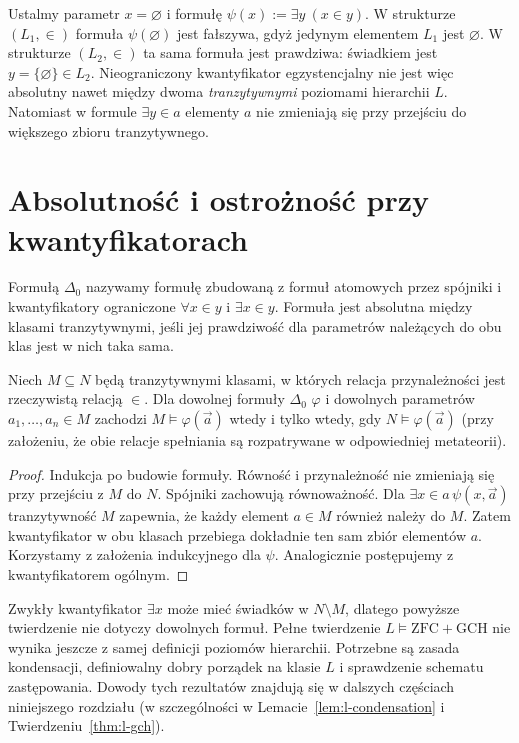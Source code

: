 \begin{przyklad}
\label{ex:l-unbounded-quantifier-34}
Ustalmy parametr $x=\varnothing$ i formułę
$\psi(x):=\exists y\ (x\in y)$. W strukturze
$(L_1,\in)$ formuła $\psi(\varnothing)$ jest fałszywa,
gdyż jedynym elementem $L_1$ jest $\varnothing$.
W strukturze $(L_2,\in)$ ta sama formuła jest
prawdziwa: świadkiem jest $y=\{\varnothing\}\in L_2$.
Nieograniczony kwantyfikator egzystencjalny nie jest
więc absolutny nawet między dwoma \emph{tranzytywnymi}
poziomami hierarchii $L$. Natomiast w formule
$\exists y\in a$ elementy $a$ nie zmieniają się
przy przejściu do większego zbioru tranzytywnego.
\end{przyklad}
\section{Absolutność i ostrożność przy kwantyfikatorach}
\begin{definicja}\label{def:delta0}
Formułą $\Delta_0$ nazywamy formułę zbudowaną z formuł atomowych przez spójniki i kwantyfikatory ograniczone $\forall x\in y$ i $\exists x\in y$. Formuła jest absolutna między klasami tranzytywnymi, jeśli jej prawdziwość dla parametrów należących do obu klas jest w nich taka sama.
\end{definicja}
\begin{twierdzenie}\label{thm:delta0-absolute}
Niech $M\subseteq N$ będą tranzytywnymi klasami, w których relacja przynależności jest rzeczywistą relacją $\in$. Dla dowolnej formuły $\Delta_0$ $\varphi$ i dowolnych parametrów $a_1,\ldots,a_n\in M$ zachodzi $M\models\varphi(\vec a)$ wtedy i tylko wtedy, gdy $N\models\varphi(\vec a)$ (przy założeniu, że obie relacje spełniania są rozpatrywane w odpowiedniej metateorii).
\end{twierdzenie}
\begin{proof}
Indukcja po budowie formuły. Równość i przynależność nie zmieniają się przy przejściu z $M$ do $N$. Spójniki zachowują równoważność. Dla $\exists x\in a\,\psi(x,\vec a)$ tranzytywność $M$ zapewnia, że każdy element $a\in M$ również należy do $M$. Zatem kwantyfikator w obu klasach przebiega dokładnie ten sam zbiór elementów $a$. Korzystamy z założenia indukcyjnego dla $\psi$. Analogicznie postępujemy z kwantyfikatorem ogólnym.
\end{proof}
\begin{uwaga}
Zwykły kwantyfikator $\exists x$ może mieć świadków w $N\setminus M$, dlatego powyższe twierdzenie nie dotyczy dowolnych formuł. Pełne twierdzenie $L\models\mathrm{ZFC}+\mathrm{GCH}$
nie wynika jeszcze z samej definicji poziomów hierarchii.
Potrzebne są zasada kondensacji, definiowalny dobry porządek
na klasie $L$ i sprawdzenie schematu zastępowania.
Dowody tych rezultatów znajdują się w dalszych częściach
niniejszego rozdziału (w szczególności w
Lemacie~\ref{lem:l-condensation} i
Twierdzeniu~\ref{thm:l-gch}).
\end{uwaga}

